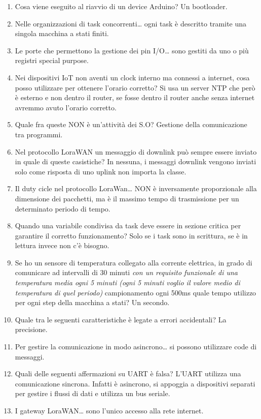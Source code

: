 \begin{enumerate}
\def\labelenumi{\arabic{enumi}.}
\item
  Cosa viene eseguito al riavvio di un device Arduino? Un bootloader.
\item
  Nelle organizzazioni di task concorrenti\ldots{} ogni task è descritto
  tramite una singola macchina a stati finiti.
\item
  Le porte che permettono la gestione dei pin I/O\ldots{} sono gestiti
  da uno o più registri special purpose.
\item
  Nei dispositivi IoT non aventi un clock interno ma connessi a
  internet, cosa posso utilizzare per ottenere l'orario corretto? Si usa
  un server NTP che però è esterno e non dentro il router, se fosse
  dentro il router anche senza internet avremmo avuto l'orario corretto.
\item
  Quale fra queste NON è un'attività dei S.O? Gestione della
  comunicazione tra programmi.
\item
  Nel protocollo LoraWAN un messaggio di downlink può sempre essere
  inviato in quale di queste casistiche? In nessuna, i messaggi downlink
  vengono inviati solo come risposta di uno uplink non importa la
  classe.
\item
  Il duty cicle nel protocollo LoraWan\ldots{} NON è inversamente
  proporzionale alla dimensione dei pacchetti, ma è il massimo tempo di
  trasmissione per un determinato periodo di tempo.
\item
  Quando una variabile condivisa da task deve essere in sezione critica
  per garantire il corretto funzionamento? Solo se i task sono in
  scrittura, se è in lettura invece non c'è bisogno.
\item
  Se ho un sensore di temperatura collegato alla corrente elettrica, in
  grado di comunicare ad intervalli di 30 minuti \emph{con un requisito
  funzionale di una temperatura media ogni 5 minuti (ogni 5 minuti
  voglio il valore medio di temperatura di quel periodo)} campionamento
  ogni 500ms quale tempo utilizzo per ogni step della macchina a stati?
  Un secondo.
\item
  Quale tra le seguenti caratteristiche è legate a errori accidentali?
  La precisione.
\item
  Per gestire la comunicazione in modo asincrono\ldots{} si possono
  utilizzare code di messaggi.
\item
  Quali delle seguenti affermazioni su UART è falsa? L'UART utilizza una
  comunicazione sincrona. Infatti è asincrono, si appoggia a dispositivi
  separati per gestire i flussi di dati e utilizza un bus seriale.
\item
  I gateway LoraWAN\ldots{} sono l'unico accesso alla rete internet.
\end{enumerate}
